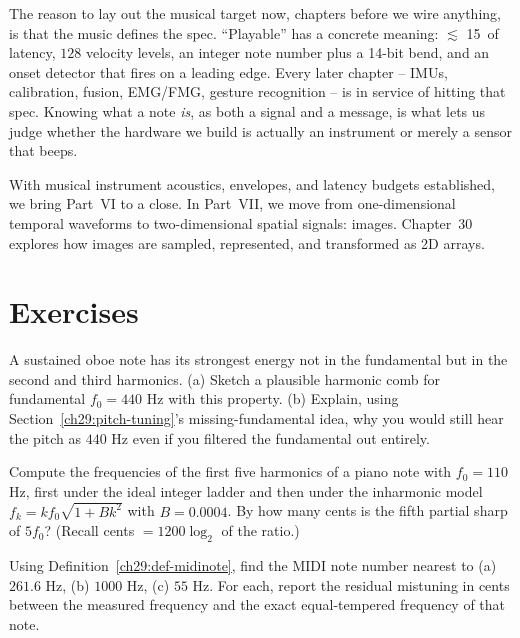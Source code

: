 \begin{aestheticbox}
The reason to lay out the musical target now, chapters before we wire anything, is that the music
defines the spec. ``Playable'' has a concrete meaning: $\lesssim$ 15\, of latency, $128$ velocity
levels, an integer note number plus a 14-bit bend, and an onset detector that fires on a leading edge.
Every later chapter -- IMUs, calibration, fusion, EMG/FMG, gesture recognition -- is in service of
hitting that spec. Knowing what a note \emph{is}, as both a signal and a message, is what lets us
judge whether the hardware we build is actually an instrument or merely a sensor that beeps.
\end{aestheticbox}

With musical instrument acoustics, envelopes, and latency budgets established, we
bring Part~VI to a close. In Part~VII, we move from one-dimensional temporal waveforms
to two-dimensional spatial signals: images. Chapter~30 explores how images are sampled,
represented, and transformed as 2D arrays.

\section{Exercises}
\label{ch29:exercises}

\begin{exercise}
A sustained oboe note has its strongest energy not in the fundamental but in the second and third
harmonics. (a) Sketch a plausible harmonic comb for fundamental $f_0 = 440$ Hz with this property.
(b) Explain, using Section~\ref{ch29:pitch-tuning}'s missing-fundamental idea, why you would still
hear the pitch as $440$ Hz even if you filtered the fundamental out entirely.
\end{exercise}

\begin{exercise}
Compute the frequencies of the first five harmonics of a piano note with $f_0 = 110$ Hz, first under
the ideal integer ladder and then under the inharmonic model $f_k = k f_0\sqrt{1 + B k^2}$ with $B =
0.0004$. By how many cents is the fifth partial sharp of $5 f_0$? (Recall cents $= 1200\log_2$ of the
ratio.)
\end{exercise}

\begin{exercise}
Using Definition~\ref{ch29:def-midinote}, find the MIDI note number nearest to (a) $261.6$ Hz, (b)
$1000$ Hz, (c) $55$ Hz. For each, report the residual mistuning in cents between the measured frequency
and the exact equal-tempered frequency of that note.
\end{exercise}


